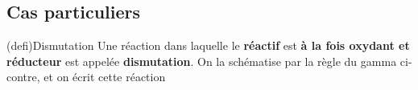 \documentclass[../../main/main.tex]{subfiles}
\begin{document}
\begin{tcb*}[sidebyside, righthand ratio=.25]
\begin{center}
{		}
		\vspace{-15pt}
		\captionsetup{justification=centering}
		\label{fig:gamma}
	\end{center}
\end{tcb*}

\subsection{Cas particuliers}
\begin{tcb*}[sidebyside, righthand ratio=.3](defi){Dismutation}
	Une réaction dans laquelle le \textbf{réactif} est \textbf{à la fois oxydant
		et réducteur} est appelée \textbf{dismutation}. On la schématise par la règle
	du gamma ci-contre, et on écrit cette réaction
	\psw{
		\[
			\ce{2A = B+C}
		\]
	}
	\vspace{-15pt}
	\tcblower
	\begin{center}
\end{center}
\end{tcb*}
\end{document}
